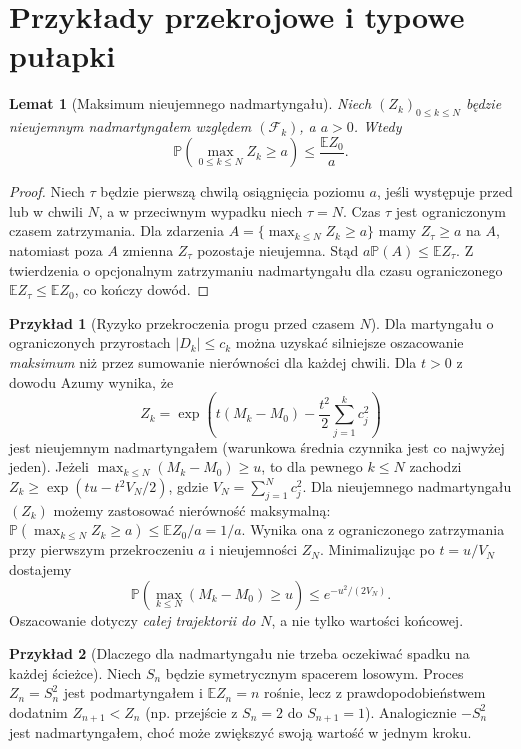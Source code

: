 \documentclass[11pt,a4paper,oneside]{report}
\numberwithin{equation}{chapter}
\theoremstyle{plain}
\newtheorem{lemat}[twierdzenie]{Lemat}
\theoremstyle{definition}
\newtheorem{przyklad}{Przykład}[chapter]
\theoremstyle{remark}
\newcommand{\Prob}{\mathbb{P}}
\newcommand{\E}{\mathbb{E}}
\begin{document}
\section{Przykłady przekrojowe i typowe pułapki}


\begin{lemat}[Maksimum nieujemnego nadmartyngału]
Niech $(Z_k)_{0\leq k\leq N}$ będzie
nieujemnym nadmartyngałem względem $(\mathcal F_k)$,
a $a>0$. Wtedy
\[
\Prob\left(\max_{0\leq k\leq N}Z_k\geq a\right)
\leq\frac{\E Z_0}{a}.
\]
\end{lemat}
\begin{proof}
Niech $\tau$ będzie pierwszą chwilą osiągnięcia
poziomu $a$, jeśli występuje przed lub w chwili $N$,
a w przeciwnym wypadku niech $\tau=N$.
Czas $\tau$ jest ograniczonym czasem zatrzymania.
Dla zdarzenia $A=\{\max_{k\leq N}Z_k\geq a\}$
mamy $Z_\tau\geq a$ na $A$, natomiast poza $A$
zmienna $Z_\tau$ pozostaje nieujemna.
Stąd $a\Prob(A)\leq\E Z_\tau$.
Z twierdzenia o opcjonalnym zatrzymaniu
nadmartyngału dla czasu ograniczonego
$\E Z_\tau\leq\E Z_0$, co kończy dowód.
\end{proof}

\begin{przyklad}[Ryzyko przekroczenia progu przed czasem $N$]
Dla martyngału o ograniczonych przyrostach
$|D_k|\leq c_k$ można uzyskać silniejsze
oszacowanie \emph{maksimum} niż przez
sumowanie nierówności dla każdej chwili.
Dla $t>0$ z dowodu Azumy wynika, że
\[
Z_k=\exp\left(t(M_k-M_0)-\frac{t^2}{2}
\sum_{j=1}^k c_j^2\right)
\]
jest nieujemnym nadmartyngałem (warunkowa średnia
czynnika jest co najwyżej jeden).
Jeżeli $\max_{k\leq N}(M_k-M_0)\geq u$, to dla
pewnego $k\leq N$ zachodzi
$Z_k\geq\exp(tu-t^2V_N/2)$, gdzie
$V_N=\sum_{j=1}^N c_j^2$.
Dla nieujemnego nadmartyngału $(Z_k)$
możemy zastosować nierówność maksymalną:
$\Prob(\max_{k\leq N}Z_k\geq a)\leq\E Z_0/a=1/a$.
Wynika ona z ograniczonego zatrzymania przy
pierwszym przekroczeniu $a$ i nieujemności
$Z_N$.
Minimalizując po $t=u/V_N$ dostajemy
\[
\Prob\left(\max_{k\leq N}(M_k-M_0)\geq u\right)
\leq e^{-u^2/(2V_N)}.
\]
Oszacowanie dotyczy \emph{całej trajektorii do $N$},
a nie tylko wartości końcowej.
\end{przyklad}

\begin{przyklad}[Dlaczego dla nadmartyngału nie trzeba oczekiwać spadku na każdej ścieżce]
Niech $S_n$ będzie symetrycznym spacerem losowym.
Proces $Z_n=S_n^2$ jest podmartyngałem i
$\E Z_n=n$ rośnie, lecz z prawdopodobieństwem
dodatnim $Z_{n+1}<Z_n$ (np. przejście z
$S_n=2$ do $S_{n+1}=1$). Analogicznie
$-S_n^2$ jest nadmartyngałem, choć
może zwiększyć swoją wartość w jednym kroku.
\end{przyklad}
\end{document}
